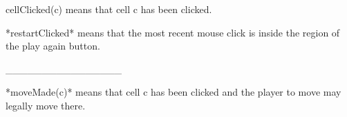 \documentclass{led_doc}
\begin{document}
\begin{ledDef}
\end{ledDef}

\begin{ledDef}
\end{ledDef}

\begin{ledDef}
\end{ledDef}

\begin{ledDef}
\end{ledDef}

\begin{ledCmnt}
cellClicked(c) means that cell c has been clicked.
\end{ledCmnt}

\begin{ledDef}
\end{ledDef}

\begin{ledCmnt}
*restartClicked* means that the most recent mouse click is inside the region of the play again button.
\end{ledCmnt}

\begin{ledDef}
\end{ledDef}

\begin{ledCmnt}
________________

*moveMade(c)* means that cell c has been clicked and the player to move may legally move there.
\end{ledCmnt}

\begin{ledDef}
\end{ledDef}
\end{document}
